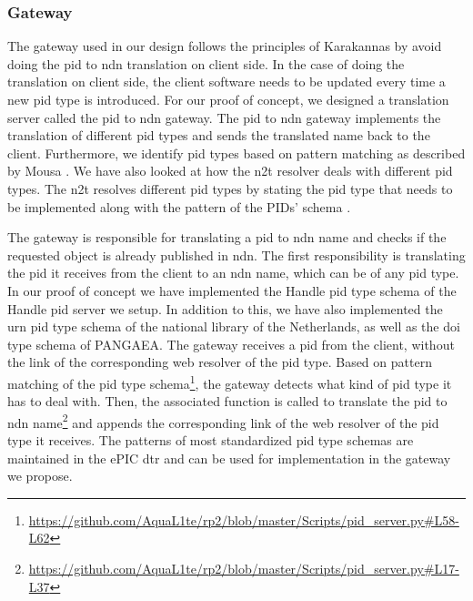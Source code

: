 \subsubsection{Gateway}\label{gw}
The gateway used in our design follows the principles of Karakannas by avoid doing the \gls{pid} to \gls{ndn} translation on client side. In the case of doing the translation on client side, the client software needs to be updated every time a new \gls{pid} type is introduced. For our proof of concept, we designed a translation server called the \gls{pid} to \gls{ndn} gateway. The \gls{pid} to \gls{ndn} gateway implements the translation of different \gls{pid} types and sends the translated name back to the client. Furthermore, we identify \gls{pid} types based on pattern matching as described by Mousa \cite{ndn-app-aware}. We have also looked at how the \gls{n2t} resolver deals with different \gls{pid} types. The \gls{n2t} resolves different \gls{pid} types by stating the \gls{pid} type that needs to be implemented along with the pattern of the PIDs' schema \cite{n2t}.

The gateway is responsible for translating a \gls{pid} to \gls{ndn} name and checks if the requested object is already published in \gls{ndn}. 
The first responsibility is translating the \gls{pid} it receives from the client to an \gls{ndn} name, which can be of any \gls{pid} type. In our proof of concept we have implemented the Handle \gls{pid} type schema of the Handle \gls{pid} server we setup. In addition to this, we have also implemented the \gls{urn} \gls{pid} type schema of the national library of the Netherlands, as well as the \gls{doi} type schema of PANGAEA. The gateway receives a \gls{pid} from the client, without the link of the corresponding web resolver of the \gls{pid} type. Based on pattern matching of the \gls{pid} type schema\footnote{\url{https://github.com/AquaL1te/rp2/blob/master/Scripts/pid_server.py\#L58-L62}}, the gateway detects what kind of \gls{pid} type it has to deal with. Then, the associated function is called to translate the \gls{pid} to \gls{ndn} name\footnote{\url{https://github.com/AquaL1te/rp2/blob/master/Scripts/pid_server.py\#L17-L37}} and appends the corresponding link of the web resolver of the \gls{pid} type it receives. 
The patterns of most standardized \gls{pid} type schemas are maintained in the ePIC \gls{dtr} \cite{dtr} and can be used for implementation in the gateway we propose. 

